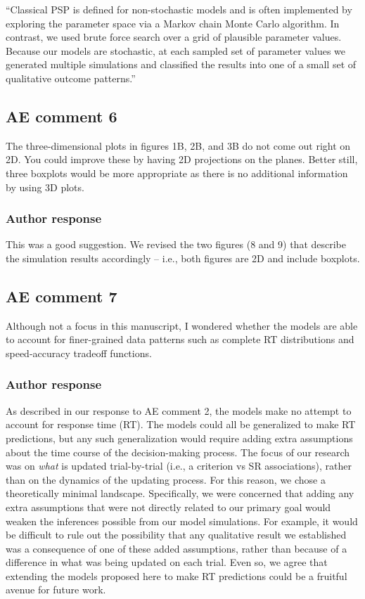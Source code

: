 \documentclass[12pt]{article}
\begin{document}
``Classical PSP is defined for non-stochastic models and is
often implemented by exploring the parameter space via a
Markov chain Monte Carlo algorithm. In contrast, we used
brute force search over a grid of plausible parameter
values. Because our models are stochastic, at each sampled
set of parameter values we generated multiple simulations
and classified the results into one of a small set of
qualitative outcome patterns.''

\subsection{AE comment 6}
The three-dimensional plots in figures 1B, 2B, and 3B do not
come out right on 2D. You could improve these by having 2D
projections on the planes. Better still, three boxplots
would be more appropriate as there is no additional
information by using 3D plots.

\subsubsection{Author response}
This was a good suggestion. We revised the two figures (8
and 9) that describe the simulation results accordingly --
i.e., both figures are 2D and include boxplots. 

\subsection{AE comment 7}
Although not a focus in this manuscript, I wondered whether
the models are able to account for finer-grained data
patterns such as complete RT distributions and
speed-accuracy tradeoff functions.

\subsubsection{Author response}
As described in our response to AE comment 2, the models
make no attempt to account for response time (RT). The
models could all be generalized to make RT predictions, but
any such generalization would require adding extra
assumptions about the time course of the decision-making
process. The focus of our research was on \textit{what} is
updated trial-by-trial (i.e., a criterion vs SR
associations), rather than on the dynamics of the updating
process. For this reason, we chose a theoretically minimal
landscape. Specifically, we were concerned that adding any
extra assumptions that were not directly related to our
primary goal would weaken the inferences possible from our
model simulations. For example, it would be difficult to
rule out the possibility that any qualitative result we
established was a consequence of one of these added
assumptions, rather than because of a difference in what was
being updated on each trial. Even so, we agree that
extending the models proposed here to make RT predictions
could be a fruitful avenue for future work. 
\end{document}
